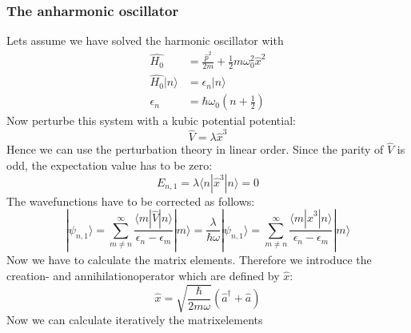 \subsubsection{The anharmonic oscillator}
Lets assume we have solved the harmonic oscillator with 
\begin{align}
    \hat{H_0} &= \frac{\hat{p}^2}{2m} 
    + \frac{1}{2} m \omega_0^2\hat{x}^2 \\
    \hat{H_0}|n \rangle &= \epsilon_n |n \rangle \\
    \epsilon_n &= \hbar \omega_0 \left (n+ \frac{1}{2} \right)
\end{align}
Now perturbe this system with a kubic potential potential:
\begin{equation}
\hat{V} =\lambda \hat{x}^3
\end{equation}
Hence we can use the perturbation theory in linear order.
Since the parity of $\hat{V}$ is odd, the expectation value has 
to be zero:
\begin{equation}
    E_{n,1} = \lambda \langle n | \hat{x}^3 | n \rangle = 0 
\end{equation}
The wavefunctions have to be corrected as follows:
\begin{equation}
    |\psi_{n,1} \rangle = \sum_{m\neq n}^{\infty}
    \frac{\langle m |\hat{V}|n \rangle}{\epsilon_n - \epsilon_m}  
    |m \rangle 
    = \frac{\lambda}{\hbar \omega}
    |\psi_{n,1} \rangle = \sum_{m\neq n}^{\infty}
    \frac{\langle m |\hat{x}^3|n \rangle}{\epsilon_n - \epsilon_m}  
    |m \rangle 
\end{equation}
Now we have to calculate the matrix elements. Therefore we
introduce the creation- and annihilationoperator 
which are defined by $\hat{x}$:
\begin{equation}
    \hat{x} = \sqrt{\frac{\hbar}{2m\omega}}(\hat{a}^\dagger +
        \hat{a})
\end{equation} 
Now we can calculate iteratively the matrixelements
